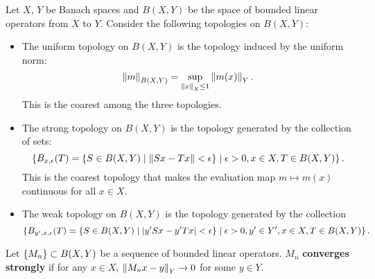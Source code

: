 \begin{remark}
    Let $X$, $Y$ be Banach spaces and $B(X, Y)$ be the space of bounded linear 
    operators from $X$ to $Y$. Consider the following topologies on $B(X,Y)$:
    \begin{itemize}
        \item The uniform topology on $B(X,Y)$ is the topology induced by the 
        uniform norm: 
        \begin{equation*}
            \left\lVert {m} \right\rVert_{B(X,Y)} = \sup_{\left\lVert {x} \right\rVert_X\leq 1} \left\lVert {m(x)} \right\rVert_Y.
        \end{equation*}
        This is the coarest among the three topologies.
        \item The strong topology on $B(X,Y)$ is the topology generated by the 
        collection of sets: 
        \begin{equation*}
            \left\{ B_{x,\epsilon}(T) = \left\{ S\in B(X,Y) \;\middle\vert\; \left\lVert {Sx - Tx} \right\rVert<\epsilon \right\} \;\middle\vert\; \epsilon>0, x\in X, T\in B(X,Y) \right\}.
        \end{equation*}
        This is the coarest topology that makes the evaluation map $m\mapsto m(x)$ 
        continuous for all $x\in X$.
        \item The weak topology on $B(X,Y)$ is the topology generated by the collection 
        \begin{equation*}
            \left\{ B_{y',x,\epsilon}(T) = \left\{ S\in B(X,Y) \;\middle\vert\; \left\lvert {y'Sx - y'Tx} \right\rvert<\epsilon \right\} \;\middle\vert\; \epsilon>0, y'\in Y', x\in X, T\in B(X,Y) \right\}.
        \end{equation*}
    \end{itemize}
\end{remark}

\begin{definition}
    Let $\left\{ {M_n} \right\}\subset B(X,Y)$ be a sequence of bounded linear operators. $M_n$ 
    \textbf{converges strongly} if for any $x\in X$, $\left\lVert {M_nx - y} \right\rVert_Y\to 0$ for some $y\in Y$.
\end{definition}

